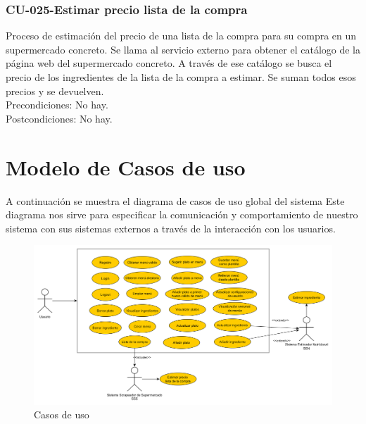 \documentclass[12pt, a4paper, twoside]{book}
\begin{document}
	\subsubsection{CU-025-Estimar precio lista de la compra}
	Proceso de estimación del precio de una lista de la compra para su compra en un supermercado concreto.
	Se llama al servicio externo para obtener el catálogo de la página web del supermercado concreto.
	A través de ese catálogo se busca el precio de los ingredientes de la lista de la compra a estimar.
	Se suman todos esos precios y se devuelven.\\
	Precondiciones: No hay.\\
	Postcondiciones: No hay.
	\section{Modelo de Casos de uso}
	A continuación se muestra el diagrama de casos de uso global del sistema
	Este diagrama nos sirve para especificar la comunicación y comportamiento de nuestro sistema con sus sistemas externos a través de la interacción con los usuarios.
	\begin{figure}[H]
		\centering
		\includegraphics[width=15cm]{Imagenes/CasosUso.png}
		\caption{Casos de uso}\label{Casos de uso}
	\end{figure} 
	
\end{document}
